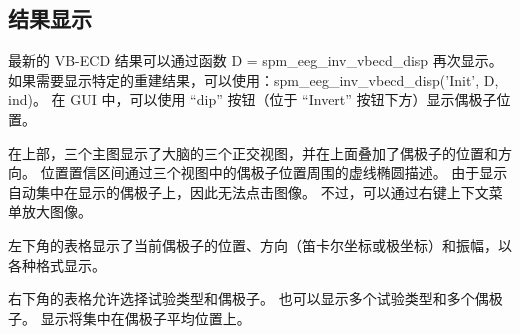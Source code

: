 \subsection{结果显示}

最新的 VB-ECD 结果可以通过函数 D = spm\_eeg\_inv\_vbecd\_disp 再次显示。
如果需要显示特定的重建结果，可以使用：spm\_eeg\_inv\_vbecd\_disp('Init', D, ind)。
在 GUI 中，可以使用 “dip” 按钮（位于 “Invert” 按钮下方）显示偶极子位置。

在上部，三个主图显示了大脑的三个正交视图，并在上面叠加了偶极子的位置和方向。
位置置信区间通过三个视图中的偶极子位置周围的虚线椭圆描述。
由于显示自动集中在显示的偶极子上，因此无法点击图像。
不过，可以通过右键上下文菜单放大图像。

左下角的表格显示了当前偶极子的位置、方向（笛卡尔坐标或极坐标）和振幅，以各种格式显示。

右下角的表格允许选择试验类型和偶极子。
也可以显示多个试验类型和多个偶极子。
显示将集中在偶极子平均位置上。